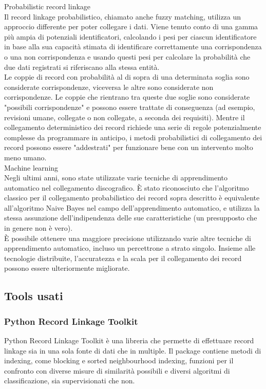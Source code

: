 \documentclass[a4paper,12pt]{article}
\begin{document}
Probabilistic record linkage %
\\
Il record linkage probabilistico, chiamato anche fuzzy matching, utilizza un approccio differente per poter collegare i dati. Viene tenuto conto di una gamma più ampia di potenziali identificatori, calcolando i pesi per ciascun identificatore in base alla sua capacità stimata di identificare correttamente una corrispondenza o una non corrispondenza e usando questi pesi per calcolare la probabilità che due dati registrati si riferiscano alla stessa entità.\\
Le coppie di record con probabilità al di sopra di una determinata soglia sono considerate corrispondenze, viceversa le altre sono considerate non corrispondenze. Le coppie che rientrano tra queste due soglie sono considerate "possibili corrispondenze" e possono essere trattate di conseguenza (ad esempio, revisioni umane, collegate o non collegate, a seconda dei requisiti). Mentre il collegamento deterministico dei record richiede una serie di regole potenzialmente complesse da programmare in anticipo, i metodi probabilistici di collegamento dei record possono essere "addestrati" per funzionare bene con un intervento molto meno umano.\\

Machine learning %
\\
Negli ultimi anni, sono state utilizzate varie tecniche di apprendimento automatico nel collegamento discografico. È stato riconosciuto che l'algoritmo classico per il collegamento probabilistico dei record sopra descritto è equivalente all'algoritmo Naive Bayes nel campo dell'apprendimento automatico, e utilizza la stessa assunzione dell'indipendenza delle sue caratteristiche (un presupposto che in genere non è vero). \\
È possibile ottenere una maggiore precisione utilizzando varie altre tecniche di apprendimento automatico, incluso un percettrone a strato singolo. Insieme alle tecnologie distribuite, l'accuratezza e la scala per il collegamento dei record possono essere ulteriormente migliorate.\\

\subsection{Tools usati}

\subsubsection{Python Record Linkage Toolkit }
Python Record Linkage Toolkit è una libreria che permette di effettuare record linkage sia in una sola fonte di dati che in multiple. Il package contiene metodi di indexing, come blocking e sorted neighbourhood indexing, funzioni per il confronto con diverse misure di similarità possibili e diversi algoritmi di classificazione, sia supervisionati che non. 
\end{document}
